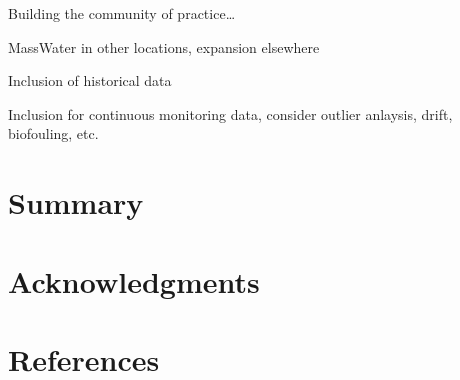 Building the community of practice\ldots{}

MassWater in other locations, expansion elsewhere

Inclusion of historical data

Inclusion for continuous monitoring data, consider outlier anlaysis, drift, biofouling, etc.

\hypertarget{summary}{%
\section{Summary}\label{summary}}

\hypertarget{acknowledgments}{%
\section{Acknowledgments}\label{acknowledgments}}

\hypertarget{references}{%
\section*{References}\label{references}}

